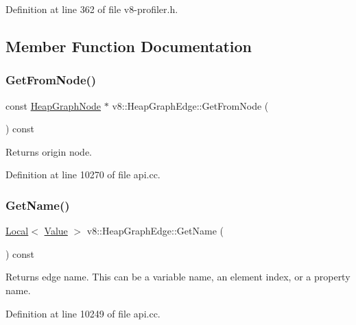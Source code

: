 Definition at line 362 of file v8-\/profiler.\+h.



\subsection{Member Function Documentation}
\mbox{\label{classv8_1_1HeapGraphEdge_a3b45afb4502d730d9b97f41a104d5e17}} 
\subsubsection{\texorpdfstring{Get\+From\+Node()}{GetFromNode()}}
{\footnotesize\ttfamily const \mbox{\hyperlink{classv8_1_1HeapGraphNode}{Heap\+Graph\+Node}} $\ast$ v8\+::\+Heap\+Graph\+Edge\+::\+Get\+From\+Node (\begin{DoxyParamCaption}{ }\end{DoxyParamCaption}) const}

Returns origin node. 

Definition at line 10270 of file api.\+cc.

\mbox{\label{classv8_1_1HeapGraphEdge_af37de5a69827bdb0faaa215b9a6542d9}} 
\subsubsection{\texorpdfstring{Get\+Name()}{GetName()}}
{\footnotesize\ttfamily \mbox{\hyperlink{classv8_1_1Local}{Local}}$<$ \mbox{\hyperlink{classv8_1_1Value}{Value}} $>$ v8\+::\+Heap\+Graph\+Edge\+::\+Get\+Name (\begin{DoxyParamCaption}{ }\end{DoxyParamCaption}) const}

Returns edge name. This can be a variable name, an element index, or a property name. 

Definition at line 10249 of file api.\+cc.

\mbox{\label{classv8_1_1HeapGraphEdge_a30120b9a5bfd427555bca63b4c3ed106}} 
